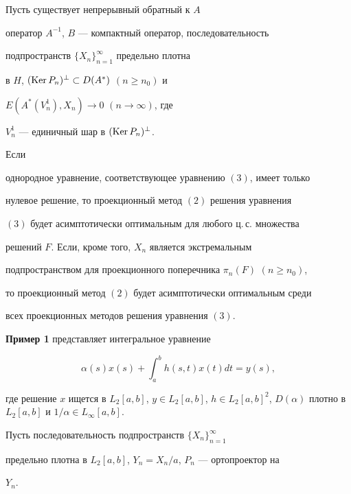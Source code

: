 \begin{thm} Пусть существует непрерывный обратный к $A$


оператор $A^{-1}$, $B$ --- компактный оператор, последовательность


подпространств $\{ X_n\} _{n=1}^{\infty}$ предельно плотна


в $H$, $(\operatorname{Ker} P_n)^\bot \subset D(A^*)$ $(n \geq n_0)$ и


$E(A^*(V_n^1),X_n) \rightarrow 0$ $(n \rightarrow \infty )$, где


$V_n^1$ --- единичный шар в $(\operatorname{Ker} P_n)^\bot$.


Если 


однородное уравнение, соответствующее уравнению $(3)$, имеет только


нулевое решение, то проекционный метод $(2)$ решения уравнения


$(3)$ будет асимптотически оптимальным для любого ц.\,с. множества


решений $F$. Если, кроме того, $X_n$ является экстремальным


подпространством для проекционного поперечника $\pi _n(F)$ $(n\geq n_0)$,


то проекционный метод $(2)$ будет асимптотически оптимальным среди


всех проекционных методов решения уравнения $(3)$.


\end{thm}





{\bf Пример 1} представляет интегральное уравнение


\begin{equation}


\alpha(s)x(s)+ \int_{a}^{b} h(s,t)x(t)dt=y(s),


\end{equation}


где решение $x$ ищется в $L_2[a,b]$, $y \in L_2[a,b]$, $h \in


L_2[a,b]^2$, $D(\alpha)$ плотно в $L_2[a,b]$ и $1/\alpha\in L_\infty [a,b]$.





Пусть последовательность подпространств $\{ X_n\} _{n=1}^{\infty}$


предельно плотна в $L_2[a,b]$, $Y_n=X_n/a$, $P_n$ --- ортопроектор на


$Y_n$.





